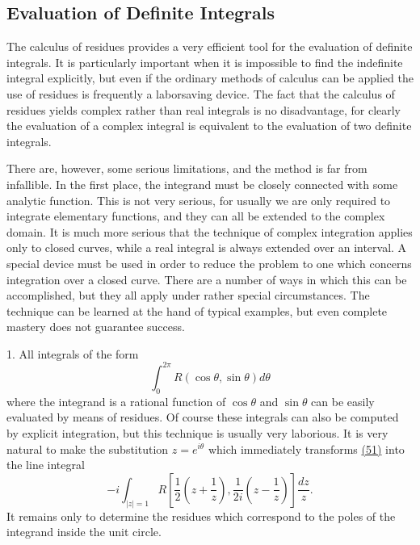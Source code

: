 \setcounter{section}{5}\setcounter{subsection}{2}\subsection{Evaluation of Definite Integrals}\label{sec:4.5.3}
The calculus of residues provides a very efficient tool for the evaluation of definite integrals. It is particularly important when it is impossible to find the indefinite integral explicitly, but even if the ordinary methods of calculus can be applied the use of residues is frequently a laborsaving device. The fact that the calculus of residues yields complex rather than real integrals is no disadvantage, for clearly the evaluation of a complex integral is equivalent to the evaluation of two definite integrals.


There are, however, some serious limitations, and the method is far from infallible. In the first place, the integrand must be closely connected with some analytic function. This is not very serious, for usually we are only required to integrate elementary functions, and they can all be extended to the complex domain. It is much more serious that the technique of complex integration applies only to closed curves, while a real integral is always extended over an interval. A special device must be used in order to reduce the problem to one which concerns integration over a closed curve. There are a number of ways in which this can be accomplished, but they all apply under rather special circumstances. The technique can be learned at the hand of typical examples, but even complete mastery does not guarantee success.

1. All integrals of the form
\begin{equation*}
\int_ {0} ^ {2 \pi} R (\cos \theta , \sin \theta) d \theta\tag{51}\label{eq:4.51}
\end{equation*}
where the integrand is a rational function of $\cos\theta$ and $\sin\theta$ can be easily evaluated by means of residues. Of course these integrals can also be computed by explicit integration, but this technique is usually very laborious. It is very natural to make the substitution $z=e^{i\theta}$ which immediately transforms \hyperref[eq:4.51]{(51)} into the line integral
\begin{equation*}
- i \int_ {| z | = 1} R \left[ \frac {1}{2} \left(z + \frac {1}{z}\right), \frac {1}{2 i} \left(z - \frac {1}{z}\right) \right] \frac {d z}{z}.
\end{equation*}
It remains only to determine the residues which correspond to the poles of the integrand inside the unit circle.

